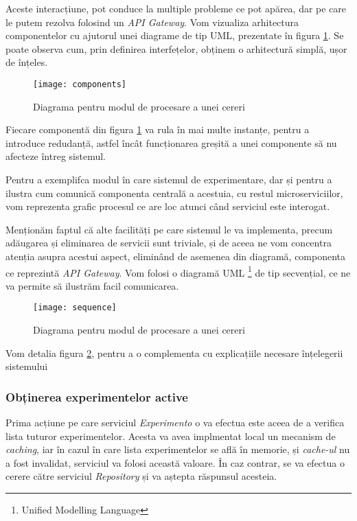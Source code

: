 Aceste interacțiune, pot conduce la multiple probleme ce pot apărea, dar pe care le putem rezolva folosind un \textit{API Gateway}. Vom vizualiza arhitectura componentelor cu ajutorul unei diagrame de tip UML, prezentate în figura \ref{fig:components}. Se poate observa cum, prin definirea interfețelor, obținem o arhitectură simplă, ușor de înțeles.

\begin{figure}[H]
	\centering
	\texttt{[image: components]}
	\caption{Diagrama pentru modul de procesare a unei cereri}
	\label{fig:components}
\end{figure}

\begin{remark}
	Fiecare componentă din figura \ref{fig:components} va rula în mai multe instanțe, pentru a introduce redudanță, astfel încât funcționarea greșită a unei componente să nu afecteze întreg sistemul.
\end{remark}  

Pentru a exemplifca modul în care sistemul de experimentare, dar și pentru a ilustra cum comunică componenta centrală a acestuia, cu restul microserviciilor, vom reprezenta grafic procesul ce are loc atunci când serviciul este interogat. 

Menționăm faptul că alte facilități pe care sistemul le va implementa, precum adăugarea și eliminarea de servicii sunt triviale, și de aceea ne vom concentra atenția asupra acestui aspect, eliminând de asemenea din diagramă, componenta ce reprezintă \textit{API Gateway}. Vom folosi o diagramă UML \footnote{Unified Modelling Language} de tip secvențial, ce ne va permite să ilustrăm facil comunicarea. 

\begin{figure}[H]
	\centering
	\texttt{[image: sequence]}
	\caption{Diagrama pentru modul de procesare a unei cereri}
	\label{fig:sequence}
\end{figure}

Vom detalia figura \ref{fig:sequence}, pentru a o complementa cu explicațiile necesare înțelegerii sistemului

\subsubsection{Obținerea experimentelor active}
Prima acțiune pe care serviciul \textit{Experimento} o va efectua este aceea de a verifica lista tuturor experimentelor. Acesta va avea implmentat local un mecanism de \textit{caching}, iar în cazul în care lista experimentelor se află în memorie, și \textit{cache-ul} nu a fost invalidat, serviciul va folosi această valoare. În caz contrar, se va efectua o cerere către serviciul \textit{Repository} și va aștepta răspunsul acesteia. 

